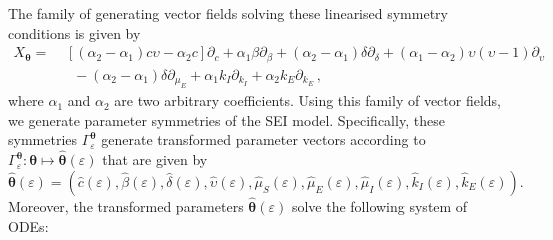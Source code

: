 \documentclass[12pt]{article}
\begin{document}
The family of generating vector fields solving these linearised symmetry conditions is given by
\begin{equation} 
\begin{split} X_{\boldsymbol{\theta}}=&\,\,[(\alpha_{2}-\alpha_{1})c\upsilon-\alpha_{2}c]\partial_{c}+\alpha_{1}\beta\partial_{\beta}+(\alpha_{2}-\alpha_{1})\delta\partial_{\delta}+(\alpha_{1}-\alpha_{2})\upsilon \left(\upsilon - 1\right)\partial_{\upsilon}\\
    &\,\,\,\,\,-(\alpha_{2}-\alpha_{1})\delta\partial_{\mu_{E}}+\alpha_{1}k_{I}\partial_{k_{I}}+\alpha_{2}k_{E}\partial_{k_{E}}\,,
    \end{split}
    \label{eq:X_SEI}
\end{equation}
where $\alpha_{1}$ and $\alpha_{2}$ are two arbitrary coefficients. Using this family of vector fields, we generate parameter symmetries of the SEI model. Specifically, these symmetries $\Gamma_{\varepsilon}^{\boldsymbol{\theta}}$ generate transformed parameter vectors according to $\Gamma_{\varepsilon}^{\boldsymbol{\theta}}:\boldsymbol{\theta}\mapsto\hat{\boldsymbol{\theta}}(\varepsilon)$ that are given by
\begin{equation}
\hat{\boldsymbol{\theta}}(\varepsilon)=(\hat{c}(\varepsilon),\hat{\beta}(\varepsilon),\hat{\delta}(\varepsilon),\hat{\upsilon}(\varepsilon),\hat{\mu}_{S}(\varepsilon),\hat{\mu}_{E}(\varepsilon),\hat{\mu}_{I}(\varepsilon),\hat{k}_{I}(\varepsilon),\hat{k}_{E}(\varepsilon)).
\label{eq:theta_SEI_trans}
\end{equation}
Moreover, the transformed parameters $\hat{\boldsymbol{\theta}}(\varepsilon)$ solve the following system of ODEs:
\end{document}

